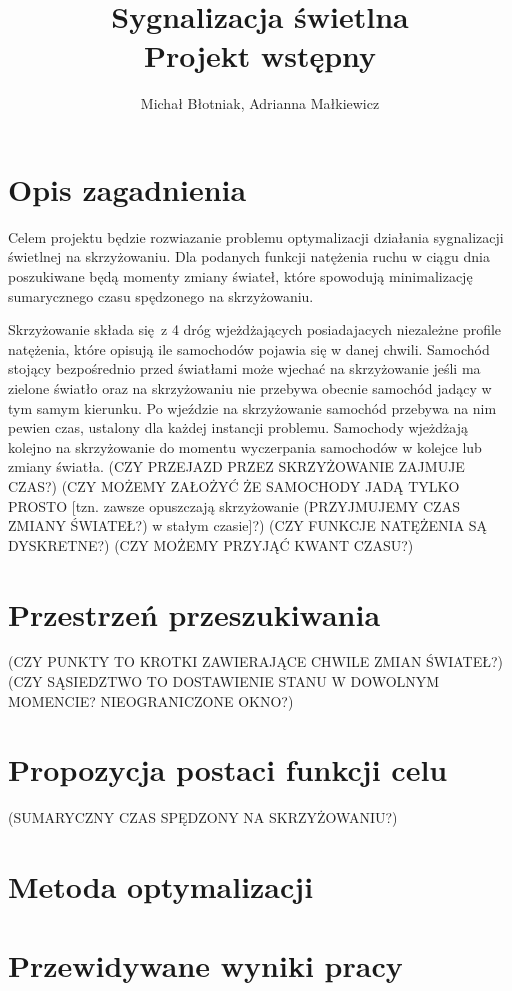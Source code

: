 \documentclass[a4paper]{article}
\title{
Sygnalizacja świetlna
\\ Projekt wstępny
}
\date{}
\author{Michał Błotniak, Adrianna Małkiewicz}
\begin{document}
\RaggedRight

\maketitle

\section{Opis zagadnienia}
Celem projektu będzie rozwiazanie problemu optymalizacji działania sygnalizacji
świetlnej na skrzyżowaniu. Dla podanych funkcji natężenia ruchu w ciągu dnia
poszukiwane będą momenty zmiany świateł, które spowodują minimalizację sumarycznego
czasu spędzonego na skrzyżowaniu.

Skrzyżowanie składa się z 4 dróg wjeżdżających posiadajacych niezależne profile
natężenia, które opisują ile samochodów pojawia się w danej chwili. Samochód stojący
bezpośrednio przed światłami może wjechać na skrzyżowanie jeśli ma zielone światło
oraz na skrzyżowaniu nie przebywa obecnie samochód jadący w tym samym kierunku.
Po wjeździe na skrzyżowanie samochód przebywa na nim pewien czas, ustalony dla
każdej instancji problemu.
Samochody wjeżdżają kolejno na skrzyżowanie do momentu wyczerpania samochodów
w kolejce lub zmiany światła.
(CZY PRZEJAZD PRZEZ SKRZYŻOWANIE ZAJMUJE CZAS?)
(CZY MOŻEMY ZAŁOŻYĆ ŻE SAMOCHODY JADĄ TYLKO PROSTO [tzn. zawsze opuszczają skrzyżowanie
(PRZYJMUJEMY CZAS ZMIANY ŚWIATEŁ?)
w stałym czasie]?)
(CZY FUNKCJE NATĘŻENIA SĄ DYSKRETNE?)
(CZY MOŻEMY PRZYJĄĆ KWANT CZASU?)
\subsection{}
\section{Przestrzeń przeszukiwania}
(CZY PUNKTY TO KROTKI ZAWIERAJĄCE CHWILE ZMIAN ŚWIATEŁ?)
(CZY SĄSIEDZTWO TO DOSTAWIENIE STANU W DOWOLNYM MOMENCIE? NIEOGRANICZONE OKNO?)
\section{Propozycja postaci funkcji celu}
(SUMARYCZNY CZAS SPĘDZONY NA SKRZYŻOWANIU?)
\section{Metoda optymalizacji}
\section{Przewidywane wyniki pracy}
\end{document}
